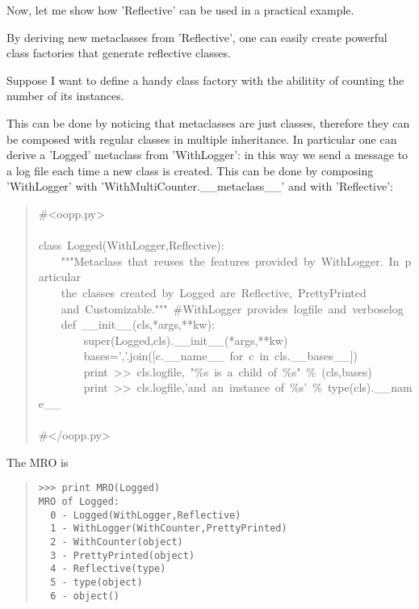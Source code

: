 \documentclass[10pt,english]{article}
\begin{document}
Now, let me show how 'Reflective' can be used in a practical example.

By deriving new metaclasses from 'Reflective', one can easily 
create powerful class factories that generate reflective classes.

Suppose I want to define a handy class 
factory with the abilitity of counting the number of its instances.

This can be done by noticing that metaclasses are just classes, therefore 
they can be composed with regular classes in multiple inheritance. In 
particular one can derive a 'Logged' metaclass from 'WithLogger': in
this way we send a message to a log file each time a new class is created.
This can be done by composing 'WithLogger' with 'WithMultiCounter.{\_}{\_}metaclass{\_}{\_}'
and with 'Reflective':
\begin{quote}
\begin{ttfamily}\begin{flushleft}
\mbox{{\#}<oopp.py>}\\
\mbox{}\\
\mbox{class~Logged(WithLogger,Reflective):~}\\
\mbox{~~~~"""Metaclass~that~reuses~the~features~provided~by~WithLogger.~In~particular}\\
\mbox{~~~~the~classes~created~by~Logged~are~Reflective,~PrettyPrinted~}\\
\mbox{~~~~and~Customizable."""~{\#}WithLogger~provides~logfile~and~verboselog}\\
\mbox{~~~~def~{\_}{\_}init{\_}{\_}(cls,*args,**kw):}\\
\mbox{~~~~~~~~super(Logged,cls).{\_}{\_}init{\_}{\_}(*args,**kw)~}\\
\mbox{~~~~~~~~bases=','.join([c.{\_}{\_}name{\_}{\_}~for~c~in~cls.{\_}{\_}bases{\_}{\_}])}\\
\mbox{~~~~~~~~print~>>~cls.logfile,~"{\%}s~is~a~child~of~{\%}s"~{\%}~(cls,bases)}\\
\mbox{~~~~~~~~print~>>~cls.logfile,'and~an~instance~of~{\%}s'~{\%}~type(cls).{\_}{\_}name{\_}{\_}}\\
\mbox{}\\
\mbox{{\#}</oopp.py>}
\end{flushleft}\end{ttfamily}
\end{quote}

The MRO is
\begin{quote}
\begin{verbatim}>>> print MRO(Logged)
MRO of Logged:
  0 - Logged(WithLogger,Reflective)
  1 - WithLogger(WithCounter,PrettyPrinted)
  2 - WithCounter(object)
  3 - PrettyPrinted(object)
  4 - Reflective(type)
  5 - type(object)
  6 - object()\end{verbatim}
\end{quote}
\end{document}
